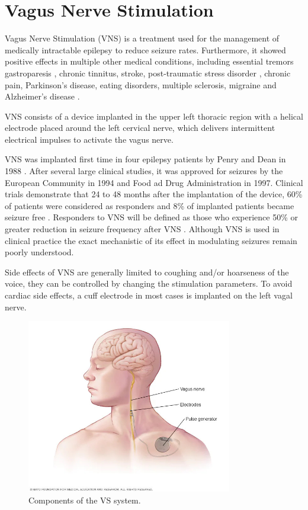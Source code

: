 \section{Vagus Nerve Stimulation}
Vagus Nerve Stimulation (VNS) is a treatment used for the management of medically intractable epilepsy to reduce seizure rates. Furthermore, it showed positive effects in multiple other medical conditions, including essential tremors gastroparesis \cite{KRAHL2004135}, chronic tinnitus, stroke, post-traumatic stress disorder \cite{HAYS2013275}, chronic pain, Parkinson's disease, eating disorders, multiple sclerosis, migraine and Alzheimer's disease \cite{BRONCEL202037, BeekwilderBeems2010}.

VNS consists of a device implanted in the upper left thoracic region with a helical electrode placed around the left cervical nerve, which delivers intermittent electrical impulses to activate the vagus nerve.

VNS was implanted first time in four epilepsy patients by Penry and Dean in 1988 \cite{Penry1990}. After several large clinical studies, it was approved for seizures by the European Community in 1994 and Food ad Drug Administration in 1997. Clinical trials demonstrate that 24 to 48 months after the implantation of the device, 60\% of patients were considered as responders and 8\% of implanted patients became seizure free \cite{Englot2016}. Responders to VNS will be defined as those who experience 50\% or greater reduction in seizure frequency after VNS \cite{IBRAHIM2017634}. Although VNS is used in clinical practice the exact mechanistic of its effect in modulating seizures remain poorly understood.

Side effects of VNS are generally limited to coughing and/or hoarseness of the voice, they can be controlled by changing the stimulation parameters. To avoid cardiac side effects, a cuff electrode in most cases is implanted on the left vagal nerve.

\begin{figure}[h]
  \centering
  \includegraphics[width=0.8\textwidth]{images/vagus_nerve_stimulation.jpg}
  \caption{Components of the VS system.}
  \label{fig:Vagus Nerve Stimulation}
\end{figure}

